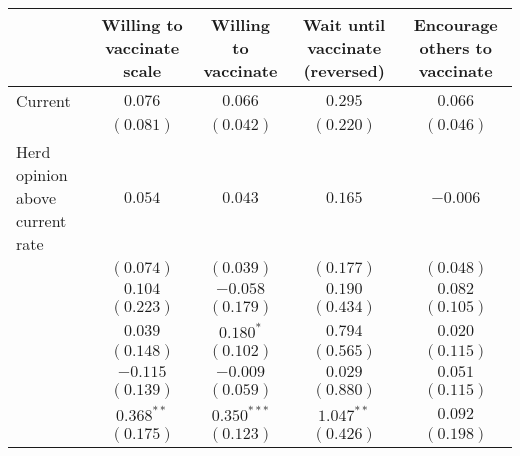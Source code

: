 \begin{table}
\begin{center}
\begin{tabular}{l c c c c}
\hline
 & Willing to vaccinate scale & Willing to vaccinate & Wait until vaccinate (reversed) & Encourage others to vaccinate \\
\hline
Current                                          & $0.076$                      & $0.066$        & $0.295$                       & $0.066$        \\
                                                 & $(0.081)$                    & $(0.042)$      & $(0.220)$                     & $(0.046)$      \\
Herd opinion above current rate                  & $0.054$                      & $0.043$        & $0.165$                       & $-0.006$       \\
                                                 & $(0.074)$                    & $(0.039)$      & $(0.177)$                     & $(0.048)$      \\
                                                 & $0.104$                      & $-0.058$       & $0.190$                       & $0.082$        \\
                                                 & $(0.223)$                    & $(0.179)$      & $(0.434)$                     & $(0.105)$      \\
                                                 & $0.039$                      & $0.180^{*}$    & $0.794$                       & $0.020$        \\
                                                 & $(0.148)$                    & $(0.102)$      & $(0.565)$                     & $(0.115)$      \\
                                                 & $-0.115$                     & $-0.009$       & $0.029$                       & $0.051$        \\
                                                 & $(0.139)$                    & $(0.059)$      & $(0.880)$                     & $(0.115)$      \\
                                                 & $0.368^{**}$                 & $0.350^{***}$  & $1.047^{**}$                  & $0.092$        \\
                                                 & $(0.175)$                    & $(0.123)$      & $(0.426)$                     & $(0.198)$      \\

\end{tabular}
\end{center}
\end{table}

